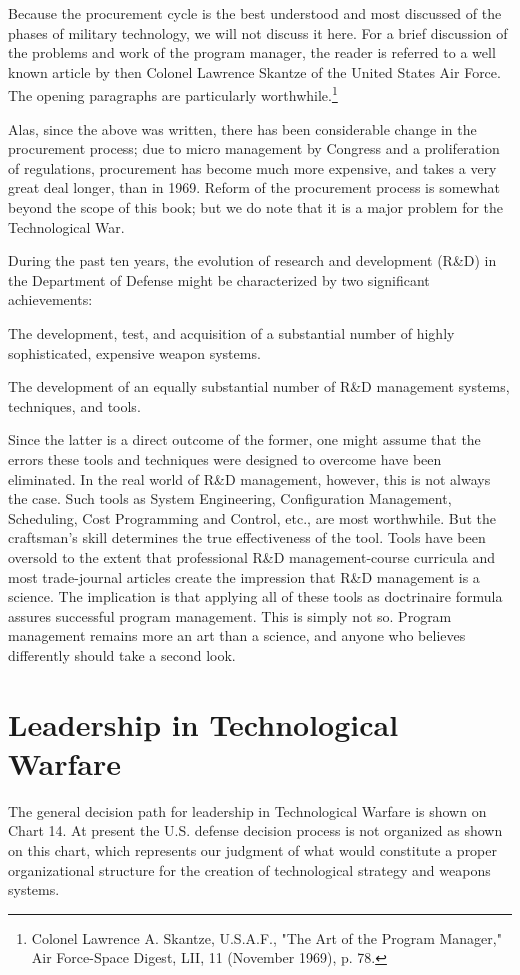 Because the procurement cycle is the best understood and most discussed of the phases of military technology, we will not discuss it here. For a brief discussion of the problems and work of the program manager, the reader is referred to a well known article by then Colonel Lawrence Skantze of the United States Air Force. The opening paragraphs are particularly worthwhile.\footnote{Colonel Lawrence A. Skantze, U.S.A.F., "The Art of the Program Manager," Air Force-Space Digest, LII, 11 (November 1969), p. 78.}

\begin{mdframed}[backgroundcolor=black!10]
Alas, since the above was written, there has been considerable change in the procurement process; due to micro management by Congress and a proliferation of regulations, procurement has become much more expensive, and takes a very great deal longer, than in 1969.
Reform of the procurement process is somewhat beyond the scope of this book; but we do note that it is a major problem for the Technological War.
\end{mdframed}

During the past ten years, the evolution of research and development (R\&D) in the Department of Defense might be characterized by two significant achievements:

The development, test, and acquisition of a substantial number of highly sophisticated, expensive weapon systems.

The development of an equally substantial number of R\&D management systems, techniques, and tools.

Since the latter is a direct outcome of the former, one might assume that the errors these tools and techniques were designed to overcome have been eliminated. In the real world of R\&D management, however, this is not always the case. Such tools as System Engineering, Configuration Management, Scheduling, Cost Programming and Control, etc., are most worthwhile. But the craftsman's skill determines the true effectiveness of the tool. Tools have been oversold to the extent that professional R\&D management-course curricula and most trade-journal articles create the impression that R\&D management is a science. The implication is that applying all of these tools as doctrinaire formula assures successful program management. This is simply not so. Program management remains more an art than a science, and anyone who believes differently should take a second look.

\section{Leadership in Technological Warfare}
The general decision path for leadership in Technological Warfare is shown on Chart 14. At present the U.S. defense decision process is not organized as shown on this chart, which represents our judgment of what would constitute a proper organizational structure for the creation of technological strategy and weapons systems.

